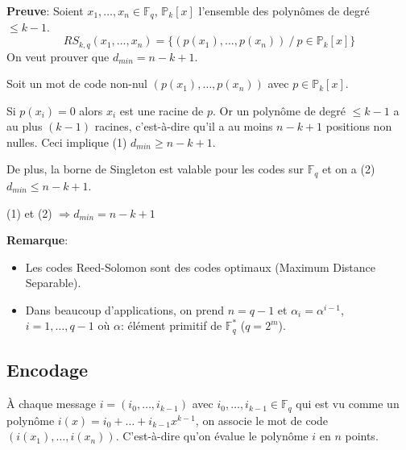 \documentclass[a4paper,10pt,twocolumn]{article}
\theoremstyle{break}
\newcommand{\F}{\mathbb{F}}
\newcommand{\Poly}{\mathbb{P}}
\newenvironment{note}[1]
{\textbf{#1}:}
{}
\newenvironment{myproof}
{\begin{note}{Preuve}}
{\end{note}}
\newenvironment{remarque}
{\begin{note}{Remarque}}
{\end{note}}
\begin{document}
\begin{myproof}
 Soient $x_1, \ldots, x_n \in \F_q$, $\Poly_k[x]$ l'ensemble des polynômes de degré $\le k-1$.
 $$ RS_{k,q}(x_1, \ldots, x_n) = \{ (p(x_1), \ldots, p(x_n)) \ /\  p \in \Poly_k[x] \} $$
 On veut prouver que $d_{min} = n-k+1$.

 Soit un mot de code non-nul $(p(x_1), \ldots, p(x_n))$ avec $p \in \Poly_k[x]$.

 Si $p(x_i) = 0$ alors $x_i$ est une racine de $p$. Or un polynôme de degré $\le k-1$ 
 a au plus $(k-1)$ racines, c'est-à-dire qu'il a au moins $n-k+1$ positions non nulles. 
 Ceci implique (1) $d_{min} \ge n-k+1$.

 De plus, la borne de Singleton est valable pour les codes sur $\F_q$ et on a (2) $d_{min} \le n-k+1$.
 
 (1) et (2) $\Longrightarrow d_{min} = n-k+1$
\end{myproof}

\begin{remarque}
\begin{itemize}
 \item Les codes Reed-Solomon sont des codes optimaux (Maximum Distance Separable).
 \item Dans beaucoup d'applications, on prend $n=q-1$ et $\alpha_i = \alpha^{i-1}$, $i=1, \ldots, q-1$ 
  où $\alpha$: élément primitif de $\F_q^*$ ($q=2^m$).
\end{itemize}
\end{remarque}

\subsection{Encodage}

À chaque message $i=(i_0, \ldots, i_{k-1})$ avec $i_0, \ldots, i_{k-1} \in \F_q$ 
qui est vu comme un polynôme $i(x) = i_0 + \ldots + i_{k-1}x^{k-1}$, on associe le mot de code
$(i(x_1), \ldots, i(x_n))$. C'est-à-dire qu'on évalue le polynôme $i$ en $n$ points.
\end{document}
